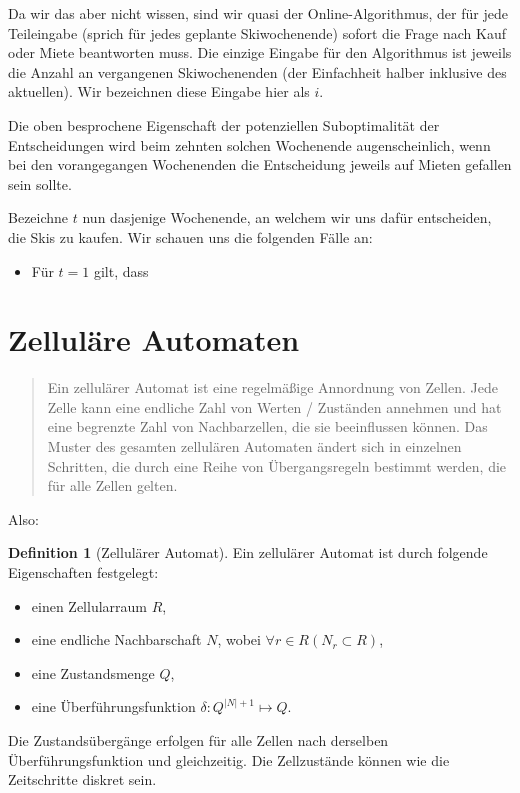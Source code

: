 \documentclass[11pt]{scrreprt} %
\theoremstyle{definition}
\newtheorem{definition}{Definition}
\begin{document}
\bigskip
Da wir das aber nicht wissen, sind wir quasi der Online-Algorithmus, der für jede Teileingabe (sprich für jedes geplante Skiwochenende) sofort die Frage nach Kauf oder Miete beantworten muss. Die einzige Eingabe für den Algorithmus ist jeweils die Anzahl an vergangenen Skiwochenenden (der Einfachheit halber inklusive des aktuellen). Wir bezeichnen diese Eingabe hier als $i$.

Die oben besprochene Eigenschaft der potenziellen Suboptimalität der Entscheidungen wird beim zehnten solchen Wochenende augenscheinlich, wenn bei den vorangegangen Wochenenden die Entscheidung jeweils auf Mieten gefallen sein sollte.

\bigskip
Bezeichne $t$ nun dasjenige Wochenende, an welchem wir uns dafür entscheiden, die Skis zu kaufen. Wir schauen uns die folgenden Fälle an:

\begin{itemize}
\item Für $t = 1$ gilt, dass 
\end{itemize}

\section{Zelluläre Automaten}

\begin{quote}Ein zellulärer Automat ist eine regelmäßige Annordnung von Zellen. Jede Zelle kann eine endliche Zahl
von Werten / Zuständen annehmen und hat eine begrenzte Zahl von Nachbarzellen, die sie beeinflussen
können. Das Muster des gesamten zellulären Automaten ändert sich in einzelnen Schritten, die durch eine
Reihe von Übergangsregeln bestimmt werden, die für alle Zellen gelten.\cite{beckmann}\end{quote}

Also:

\begin{definition}[Zellulärer Automat] Ein zellulärer Automat ist durch folgende Eigenschaften festgelegt:
\begin{itemize}
\item einen Zellularraum $R$,
\item eine endliche Nachbarschaft $N$, wobei $\forall r \in R \left(N_r \subset R\right)$,
\item eine Zustandsmenge $Q$,
\item eine Überführungsfunktion $\delta: Q^{|N| + 1}\mapsto Q$.
\end{itemize}
Die Zustandsübergänge erfolgen für alle Zellen nach derselben Überführungsfunktion und gleichzeitig. Die Zellzustände können wie die Zeitschritte diskret sein. \cite{wiki:zellautomat}

\end{definition}
\end{document}
